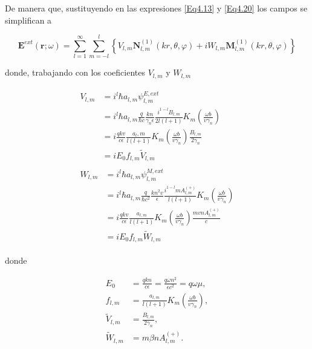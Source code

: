 \documentclass[a4paper,10pt]{article}
\begin{document}
De manera que, sustituyendo en las expresiones \eqref{Eq4.13} y \eqref{Eq4.20} los campos se simplifican a

\begin{equation}
\textbf{E}^{ext}(\textbf{r};\omega)=\sum_{l=1}^{\infty}\sum_{m=-l}^l	\left\{ 	V_{l,m}\textbf{N}_{l,m}^{(1)}(kr,\theta,\varphi)+iW_{l,m}\textbf{M}_{l,m}^{(1)}(kr,\theta,\varphi)	\right\}
\label{Eq5.7}
\end{equation}

donde, trabajando con los coeficientes $V_{l,m}$ y $W_{l,m}$

\begin{subequations}
\begin{align}
\begin{split}
V_{l,m}
&=i^l\hbar a_{l,m}\psi_{l,m}^{E,ext}\\
&=i^l\hbar a_{l,m}\frac{q}{\hbar c}\frac{kn}{\gamma_n\epsilon}\frac{i^{1-l}B_{l,m}}{2l(l+1)}K_m\left(\frac{\omega b}{v\gamma_n}\right)\\
&=i\frac{qkv}{c\epsilon}\frac{a_l,m}{l(l+1)}K_m\left(\frac{\omega b}{v\gamma_n}\right)\frac{B_{l,m}}{2\gamma_n}\\
&=iE_0	f_{l,m}	\tilde{V}_{l,m}
\end{split}\\
\begin{split}
W_{l,m}
&=i^l\hbar a_{l,m}\psi_{l,m}^{M,ext}	\\
&=i^l\hbar a_{l,m} \frac{q}{\hbar c^2}\frac{kn^2 v}{\epsilon}\frac{i^{1-l}mA_{l,m}^{(+)}}{l(l+1)}K_m\left(\frac{\omega b}{v\gamma_n}\right)\\
&=i\frac{qkv}{c\epsilon}\frac{a_{l,m}}{l(l+1)}K_m\left(\frac{\omega b}{v\gamma_n}\right)\frac{mvnA_{l,m}^{(+)}}{c}	\\
&=iE_0 f_{l,m}	\tilde{W}_{l,m}
\end{split}
\end{align}
\label{Eq5.8}
\end{subequations}

donde

\begin{subequations}
\begin{align}
E_0	&=\frac{qkn}{c\epsilon}=\frac{q\omega n^2}{\epsilon c^2}=q\omega\mu,	\\
f_{l,m}	&=\frac{a_{l,m}}{l(l+1)}K_m\left(\frac{\omega b}{v\gamma_n}\right),	\\
\tilde{V}_{l,m}	&=\frac{B_{l,m}}{2\gamma_n},	\\
\tilde{W}_{l,m}	&=m\beta n A_{l,m}^{(+)}.
\end{align}
\label{Eq5.9}
\end{subequations}
\end{document}
